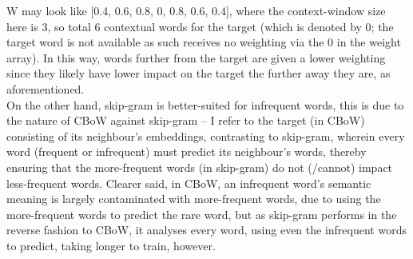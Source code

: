 W may look like [0.4, 0.6, 0.8, 0, 0.8, 0.6, 0.4], where the context-window size here is 3, so total 6 contextual words for the target (which is denoted by 0; the target word is not available as such receives no weighting via the 0 in the weight array). In this way, words further from the target are given a lower weighting since they likely have lower impact on the target the further away they are, as aforementioned.\\
On the other hand, skip-gram is better-suited for infrequent words, this is due to the nature of CBoW against skip-gram -- I refer to the target (in CBoW) consisting of its neighbour's embeddings, contrasting to skip-gram, wherein every word (frequent or infrequent) must predict its neighbour's words, thereby ensuring that the more-frequent words (in skip-gram) do not (/cannot) impact less-frequent words. Clearer said, in CBoW, an infrequent word's semantic meaning is largely contaminated with more-frequent words, due to using the more-frequent words to predict the rare word, but as skip-gram performs in the reverse fashion to CBoW, it analyses every word, using even the infrequent words to predict, taking longer to train, however.